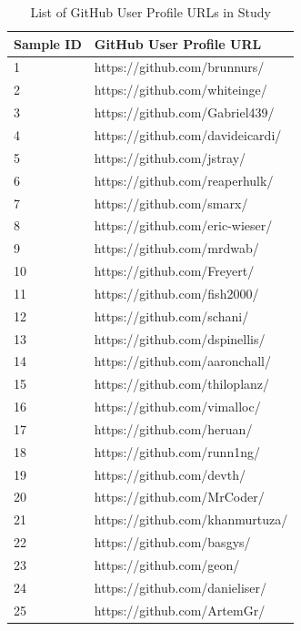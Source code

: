             \begin{center}
            \begin{longtable}{|p{2cm}|p{7cm}|}
            \caption{List of GitHub User Profile URLs in Study} \label{survey_GH_userURLS} \\
             \hline
            \textbf{Sample ID} & \textbf{GitHub User Profile URL} \\
             \hline
            1 & https://github.com/brunnurs/ \\
            2 & https://github.com/whiteinge/ \\
            3 & https://github.com/Gabriel439/ \\
            4 & https://github.com/davideicardi/ \\
            5 & https://github.com/jstray/ \\
            6 & https://github.com/reaperhulk/ \\
            7 & https://github.com/smarx/ \\
            8 & https://github.com/eric-wieser/ \\
            9 & https://github.com/mrdwab/ \\
            10 & https://github.com/Freyert/ \\
            11 & https://github.com/fish2000/ \\
            12 & https://github.com/schani/ \\
            13 & https://github.com/dspinellis/ \\
            14 & https://github.com/aaronchall/ \\
            15 & https://github.com/thiloplanz/ \\
            16 & https://github.com/vimalloc/ \\
            17 & https://github.com/heruan/ \\
            18 & https://github.com/runn1ng/ \\
            19 & https://github.com/devth/ \\
            20 & https://github.com/MrCoder/ \\
            21 & https://github.com/khanmurtuza/ \\
            22 & https://github.com/basgys/ \\
            23 & https://github.com/geon/ \\
            24 & https://github.com/danieliser/ \\
            25 & https://github.com/ArtemGr/ \\

\end{longtable}
\end{center}
